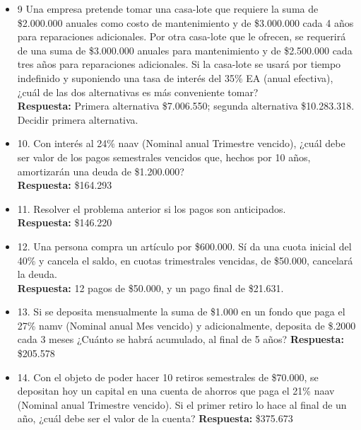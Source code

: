 \begin{itemize}
	\item 9 Una empresa pretende tomar una casa-lote que requiere la suma de \$2.000.000 anuales como costo de mantenimiento y de \$3.000.000 cada 4 años para reparaciones adicionales. Por otra casa-lote que le ofrecen, se requerirá de una suma de \$3.000.000 anuales para mantenimiento y de \$2.500.000 cada tres años para reparaciones adicionales. Si la casa-lote se usará por tiempo indefinido y suponiendo una tasa de interés del 35\% EA (anual efectiva), ¿cuál de las dos alternativas es más conveniente tomar?\\
	\textbf{Respuesta:} Primera alternativa \$7.006.550; segunda alternativa \$10.283.318. Decidir primera alternativa.\\
	\medskip
	
	\item 10. Con interés al 24\%  naav (Nominal anual Trimestre vencido), ¿cuál debe ser valor de los pagos semestrales vencidos que, hechos por 10 años, amortizarán una deuda de \$1.200.000?\\
	\textbf{Respuesta:} \$164.293
	\medskip
	
	\item 11. Resolver el problema anterior si los pagos son anticipados.\\
	\textbf{Respuesta:} \$146.220\\
	\medskip
	
	\item 12. Una persona compra un artículo por \$600.000. Sí da una cuota inicial del 40\% y cancela el saldo, en cuotas trimestrales vencidas, de \$50.000, cancelará la deuda.\\
	\textbf{Respuesta:} 12 pagos de \$50.000, y un pago final de \$21.631.\\
	\medskip
	
	\item 13. Si se deposita mensualmente la suma de \$1.000 en un fondo que paga el 27\%  namv (Nominal anual Mes vencido) y adicionalmente, deposita de \$.2000 cada 3 meses ¿Cuánto se habrá acumulado, al final de 5 años?
	\textbf{Respuesta:} \$205.578
	\medskip
	
	\item 14. Con  el objeto de poder hacer 10 retiros semestrales de \$70.000, se depositan hoy un capital en una cuenta de ahorros que paga el 21\%  naav (Nominal anual Trimestre vencido). Si el primer retiro lo hace al final de un año, ¿cuál debe ser el valor de la cuenta?
	\textbf{Respuesta:} \$375.673\\
	\medskip
	

\end{itemize}
